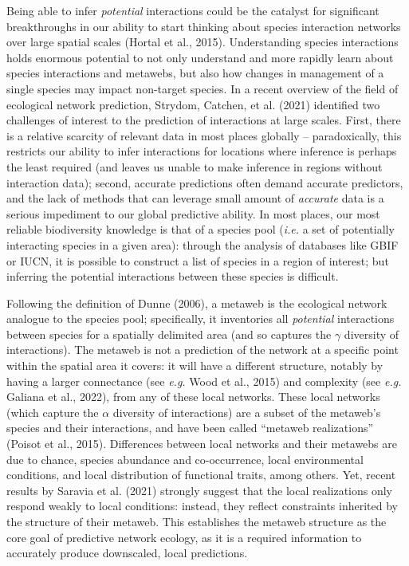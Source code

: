 \documentclass[11pt]{article}
\begin{document}
Being able to infer \emph{potential} interactions could be the catalyst
for significant breakthroughs in our ability to start thinking about
species interaction networks over large spatial scales (Hortal et al.,
2015). Understanding species interactions holds enormous potential to
not only understand and more rapidly learn about species interactions
and metawebs, but also how changes in management of a single species may
impact non-target species. In a recent overview of the field of
ecological network prediction, Strydom, Catchen, et al. (2021)
identified two challenges of interest to the prediction of interactions
at large scales. First, there is a relative scarcity of relevant data in
most places globally -- paradoxically, this restricts our ability to
infer interactions for locations where inference is perhaps the least
required (and leaves us unable to make inference in regions without
interaction data); second, accurate predictions often demand accurate
predictors, and the lack of methods that can leverage small amount of
\emph{accurate} data is a serious impediment to our global predictive
ability. In most places, our most reliable biodiversity knowledge is
that of a species pool (\emph{i.e.} a set of potentially interacting
species in a given area): through the analysis of databases like GBIF or
IUCN, it is possible to construct a list of species in a region of
interest; but inferring the potential interactions between these species
is difficult.

Following the definition of Dunne (2006), a metaweb is the ecological
network analogue to the species pool; specifically, it inventories all
\emph{potential} interactions between species for a spatially delimited
area (and so captures the \(\gamma\) diversity of interactions). The
metaweb is not a prediction of the network at a specific point within
the spatial area it covers: it will have a different structure, notably
by having a larger connectance (see \emph{e.g.} Wood et al., 2015) and
complexity (see \emph{e.g.} Galiana et al., 2022), from any of these
local networks. These local networks (which capture the \(\alpha\)
diversity of interactions) are a subset of the metaweb's species and
their interactions, and have been called ``metaweb realizations''
(Poisot et al., 2015). Differences between local networks and their
metawebs are due to chance, species abundance and co-occurrence, local
environmental conditions, and local distribution of functional traits,
among others. Yet, recent results by Saravia et al. (2021) strongly
suggest that the local realizations only respond weakly to local
conditions: instead, they reflect constraints inherited by the structure
of their metaweb. This establishes the metaweb structure as the core
goal of predictive network ecology, as it is a required information to
accurately produce downscaled, local predictions.
\end{document}
